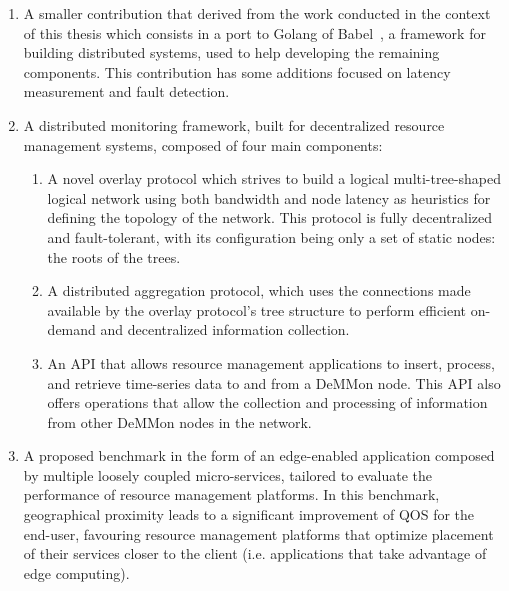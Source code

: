 \begin{enumerate}

    \item A smaller contribution that derived from the work conducted in the context of this thesis which consists in a port to Golang of Babel~\cite{babel}, a framework for building distributed systems, used to help developing the remaining components. This contribution has some additions focused on latency measurement and fault detection.

    \item A distributed monitoring framework, built for decentralized resource management systems, composed of four main components: {
        \begin{enumerate}

            \item A novel overlay protocol which strives to build a logical multi-tree-shaped logical network using both bandwidth and node latency as heuristics for defining the topology of the network. This protocol is fully decentralized and fault-tolerant, with its configuration being only a set of static nodes: the roots of the trees.
            
            \item A distributed aggregation protocol, which uses the connections made available by the overlay protocol's tree structure to perform efficient on-demand and decentralized information collection.
            
            \item An API that allows resource management applications to insert, process, and retrieve time-series data to and from a DeMMon node. This API also offers operations that allow the collection and processing of information from other DeMMon nodes in the network. 
            
        \end{enumerate}
        }
            
    \item A proposed benchmark in the form of an edge-enabled application composed by multiple loosely coupled micro-services, tailored to evaluate the performance of resource management platforms. In this benchmark, geographical proximity leads to a significant improvement of QOS for the end-user, favouring resource management platforms that optimize placement of their services closer to the client (i.e. applications that take advantage of edge computing).
    

\end{enumerate}
